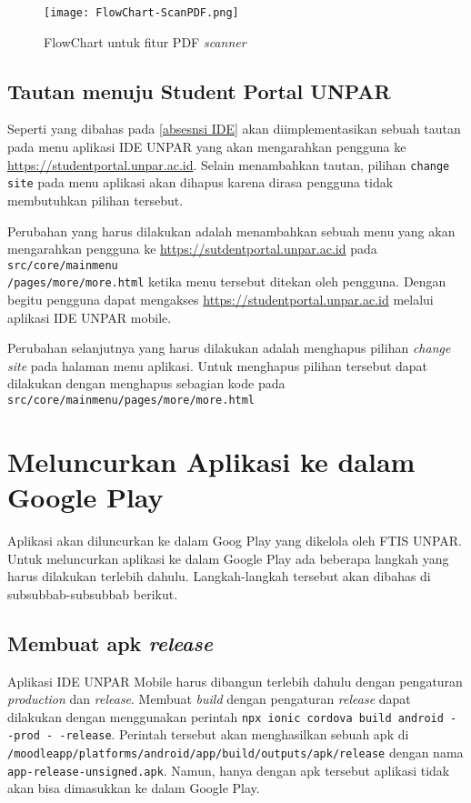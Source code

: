 \begin{figure}[H] 
	\centering  
	\texttt{[image: FlowChart-ScanPDF.png]}  
	\caption[FlowChart untuk fitur PDF \textit{scanner}] {FlowChart untuk fitur PDF \textit{scanner}} 
	\label{fig:scan:flowchart} 
\end{figure} 

\subsection{Tautan menuju Student Portal UNPAR}
\label{feat:menu:link}
Seperti yang dibahas pada \ref{absesnsi IDE} akan diimplementasikan sebuah tautan pada menu aplikasi IDE UNPAR yang akan mengarahkan pengguna ke \url{https://studentportal.unpar.ac.id}. Selain menambahkan tautan, pilihan \texttt{change site} pada menu aplikasi akan dihapus karena dirasa pengguna tidak membutuhkan pilihan tersebut.

Perubahan yang harus dilakukan adalah menambahkan sebuah menu yang akan mengarahkan pengguna ke \url{https://sutdentportal.unpar.ac.id} pada \texttt{src/core/mainmenu\\/pages/more/more.html} ketika menu tersebut ditekan oleh pengguna. Dengan begitu pengguna dapat mengakses \url{https://studentportal.unpar.ac.id} melalui aplikasi IDE UNPAR mobile.

Perubahan selanjutnya yang harus dilakukan adalah menghapus pilihan \textit{change site} pada halaman menu aplikasi. Untuk menghapus pilihan tersebut dapat dilakukan dengan menghapus sebagian kode pada \texttt{src/core/mainmenu/pages/more/more.html}

\section{Meluncurkan Aplikasi ke dalam Google Play}
\label{apk:release}
Aplikasi akan diluncurkan ke dalam Goog Play yang dikelola oleh FTIS UNPAR. Untuk meluncurkan aplikasi ke dalam Google Play ada beberapa langkah yang harus dilakukan terlebih dahulu. Langkah-langkah tersebut akan dibahas di subsubbab-subsubbab berikut.

\subsection{Membuat apk \textit{release}}

Aplikasi IDE UNPAR Mobile harus dibangun terlebih dahulu dengan pengaturan \textit{production} dan \textit{release}. Membuat \textit{build} dengan pengaturan \textit{release} dapat dilakukan dengan menggunakan perintah \texttt{npx ionic cordova build android - -prod - -release}. Perintah tersebut akan menghasilkan sebuah apk di \texttt{/moodleapp/platforms/android/app/build/outputs/apk/release} dengan nama \texttt{app-release-unsigned.apk}. Namun, hanya dengan apk tersebut aplikasi tidak akan bisa dimasukkan ke dalam Google Play.

